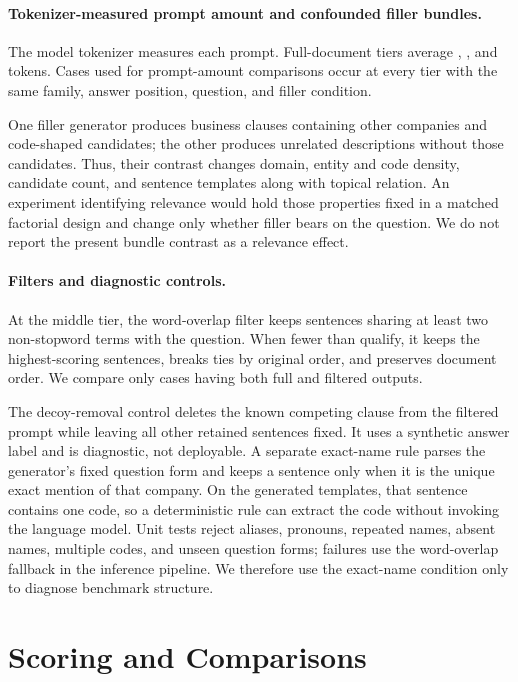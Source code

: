 \documentclass{article}
\begin{document}
\paragraph{Tokenizer-measured prompt amount and confounded filler bundles.}
The model tokenizer measures each prompt. Full-document tiers average \tierTwoTokens{}, \tierFourTokens{}, and \tierEightTokens{} tokens. Cases used for prompt-amount comparisons occur at every tier with the same family, answer position, question, and filler condition.

One filler generator produces business clauses containing other companies and code-shaped candidates; the other produces unrelated descriptions without those candidates. Thus, their contrast changes domain, entity and code density, candidate count, and sentence templates along with topical relation. An experiment identifying relevance would hold those properties fixed in a matched factorial design and change only whether filler bears on the question. We do not report the present bundle contrast as a relevance effect.

\paragraph{Filters and diagnostic controls.}
At the middle tier, the word-overlap filter keeps sentences sharing at least two non-stopword terms with the question. When fewer than \pruneFloor{} qualify, it keeps the \pruneFloor{} highest-scoring sentences, breaks ties by original order, and preserves document order. We compare only cases having both full and filtered outputs.

The decoy-removal control deletes the known competing clause from the filtered prompt while leaving all other retained sentences fixed. It uses a synthetic answer label and is diagnostic, not deployable. A separate exact-name rule parses the generator's fixed question form and keeps a sentence only when it is the unique exact mention of that company. On the generated templates, that sentence contains one code, so a deterministic rule can extract the code without invoking the language model. Unit tests reject aliases, pronouns, repeated names, absent names, multiple codes, and unseen question forms; failures use the word-overlap fallback in the inference pipeline. We therefore use the exact-name condition only to diagnose benchmark structure.

\section{Scoring and Comparisons}
\end{document}
